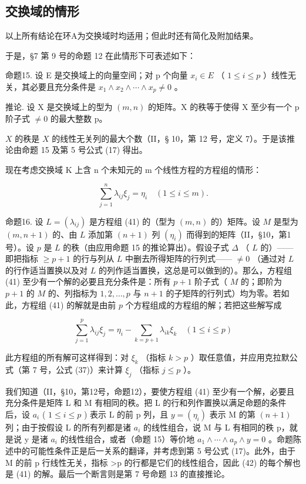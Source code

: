 \subsection{交换域的情形}

以上所有结论在环A为交换域时均适用；但此时还有简化及附加结果。

于是，§7 第 9 号的命题 12 在此情形下可表述如下：

命题15. 设 E 是交换域上的向量空间；对 p 个向量 \(x_{i} \in E\) （ \(1 \leqslant i \leqslant p\) ）线性无关，其必要且充分条件是 \(x_{1} \wedge x_{2} \wedge \cdots \wedge x_{p} \neq 0\) 。

推论. 设 X 是交换域上的型为 \((m, n)\) 的矩阵。X 的秩等于使得 X 至少有一个 p 阶子式 \(\neq0\) 的最大整数 p。

\(X\) 的秩是 \(X\) 的线性无关列的最大个数（II，§ 10，第 12 号，定义 7）。于是该推论由命题 15 及第 5 号公式 (17) 得出。

现在考虑交换域 K 上含 n 个未知元的 m 个线性方程的方程组的情形：

\[
\sum_ {j = 1} ^ {n} \lambda_ {i j} \xi_ {j} = \eta_ {i} \quad (1 \leqslant i \leqslant m).\tag{41}
\]

命题16. 设 \(L = (\lambda_{ij})\) 是方程组 (41) 的（型为 \((m, n)\) 的）矩阵。设 \(M\) 是型为 \((m, n + 1)\) 的、由 \(L\) 添加第 \((n + 1)\) 列 \((\eta_i)\) 而得到的矩阵（II，§10，第1号）。设 \(p\) 是 \(L\) 的秩（由应用命题 15 的推论算出）。假设子式 \(\Delta\) （ \(L\) 的）——即把指标 \(\geqslant p + 1\) 的行与列从 \(L\) 中删去所得矩阵的行列式—— \(\neq 0\) （通过对 \(L\) 的行作适当置换以及对 \(L\) 的列作适当置换，这总是可以做到的）。那么，方程组 (41) 至少有一个解的必要且充分条件是：所有 \(p + 1\) 阶子式（ \(M\) 的；即阶为 \(p + 1\) 的 \(M\) 的、列指标为 \(1, 2, \ldots, p\) 与 \(n + 1\) 的子矩阵的行列式）均为零。若如此，方程组 (41) 的解就是由前 \(p\) 个方程组成的方程组的解；若把这些解写成

\[
\sum_ {j = 1} ^ {p} \lambda_ {i j} \xi_ {j} = \eta_ {i} - \sum_ {k = p + 1} \lambda_ {i k} \xi_ {k} \quad (1 \leqslant i \leqslant p)\tag{42}
\]

此方程组的所有解可这样得到：对 \(\xi_{k}\) （指标 \(k > p\) ）取任意值，并应用克拉默公式（第 7 号，公式 (37)）来计算 \(\xi_{j}\) （指标 \(j \leqslant p\) ）。

我们知道（II，§10，第12号，命题12），要使方程组 (41) 至少有一个解，必要且充分条件是矩阵 L 和 M 有相同的秩。把 L 的行和列作置换以满足命题的条件后，设 \(a_{i}\) ( \(1 \leqslant i \leqslant p\) ) 表示 L 的前 p 列，且 \(y = (\eta_{i})\) 表示 M 的第 \((n + 1)\) 列；由于按假设 L 的所有列都是诸 \(a_{i}\) 的线性组合，说 M 与 L 有相同的秩 p，就是说 y 是诸 \(a_{i}\) 的线性组合，或者（命题 15）等价地 \(a_{1} \wedge \cdots \wedge a_{p} \wedge y = 0\) 。命题陈述中的可能性条件正是后一关系的翻译，并考虑到第 5 号公式 (17)。此外，由于 M 的前 p 行线性无关，指标 \textgreater p 的行都是它们的线性组合，因此 (42) 的每个解也是 (41) 的解。最后一个断言则是第 7 号命题 13 的直接推论。

